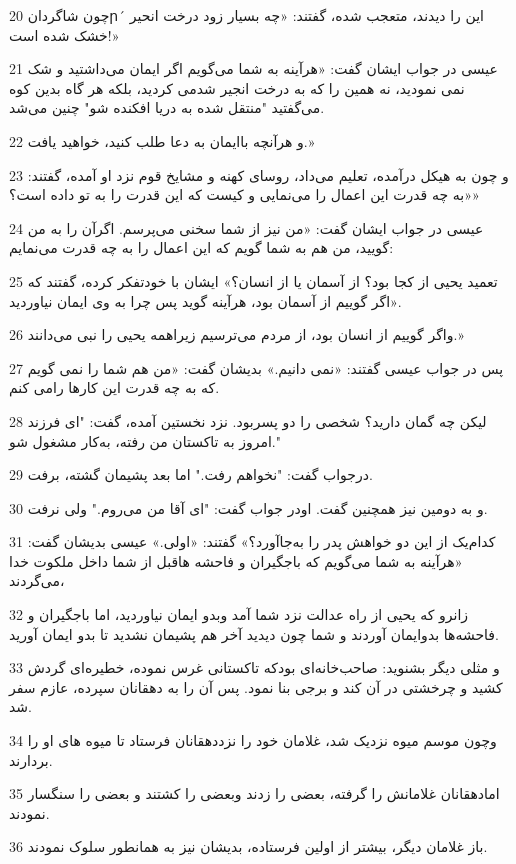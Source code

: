\par 20 چون شاگردانր´ این را دیدند، متعجب شده، گفتند: «چه بسیار زود درخت انحیر خشک شده است!»
\par 21 عیسی در جواب ایشان گفت: «هرآینه به شما می‌گویم اگر ایمان می‌داشتید و شک نمی نمودید، نه همین را که به درخت انجیر شدمی کردید، بلکه هر گاه بدین کوه می‌گفتید "منتقل شده به دریا افکنده شو" چنین می‌شد.
\par 22 و هرآنچه با‌ایمان به دعا طلب کنید، خواهید یافت.»
\par 23 و چون به هیکل درآمده، تعلیم می‌داد، روسای کهنه و مشایخ قوم نزد او آمده، گفتند: «به چه قدرت این اعمال را می‌نمایی و کیست که این قدرت را به تو داده است؟»
\par 24 عیسی در جواب ایشان گفت: «من نیز از شما سخنی می‌پرسم. اگرآن را به من گویید، من هم به شما گویم که این اعمال را به چه قدرت می‌نمایم:
\par 25 تعمید یحیی از کجا بود؟ از آسمان یا از انسان؟» ایشان با خودتفکر کرده، گفتند که «اگر گوییم از آسمان بود، هرآینه گوید پس چرا به وی ایمان نیاوردید.
\par 26 واگر گوییم از انسان بود، از مردم می‌ترسیم زیراهمه یحیی را نبی می‌دانند.»
\par 27 پس در جواب عیسی گفتند: «نمی دانیم.» بدیشان گفت: «من هم شما را نمی گویم که به چه قدرت این کارها رامی کنم.
\par 28 لیکن چه گمان دارید؟ شخصی را دو پسربود. نزد نخستین آمده، گفت: "ای فرزند امروز به تاکستان من رفته، به‌کار مشغول شو."
\par 29 درجواب گفت: "نخواهم رفت." اما بعد پشیمان گشته، برفت.
\par 30 و به دومین نیز همچنین گفت. اودر جواب گفت: "ای آقا من می‌روم." ولی نرفت.
\par 31 کدام‌یک از این دو خواهش پدر را به‌جاآورد؟» گفتند: «اولی.» عیسی بدیشان گفت: «هرآینه به شما می‌گویم که باجگیران و فاحشه هاقبل از شما داخل ملکوت خدا می‌گردند،
\par 32 زانرو که یحیی از راه عدالت نزد شما آمد وبدو ایمان نیاوردید، اما باجگیران و فاحشه‌ها بدوایمان آوردند و شما چون دیدید آخر هم پشیمان نشدید تا بدو ایمان آورید.
\par 33 و مثلی دیگر بشنوید: صاحب‌خانه‌ای بودکه تاکستانی غرس نموده، خطیره‌ای گردش کشید و چرخشتی در آن کند و برجی بنا نمود. پس آن را به دهقانان سپرده، عازم سفر شد.
\par 34 وچون موسم میوه نزدیک شد، غلامان خود را نزددهقانان فرستاد تا میوه های او را بردارند.
\par 35 امادهقانان غلامانش را گرفته، بعضی را زدند وبعضی را کشتند و بعضی را سنگسار نمودند.
\par 36 باز غلامان دیگر، بیشتر از اولین فرستاده، بدیشان نیز به همانطور سلوک نمودند.
